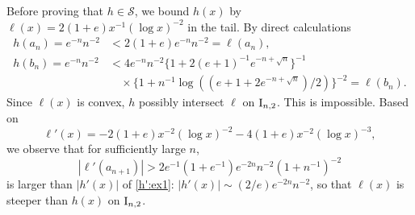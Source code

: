 \documentclass[12pt,leqno]{amsart}
\newcommand{\rI}{{\rm I}}
\newcommand{\cals}{{\mathcal S}}
\newcommand{\1}{{\mathbf 1}}
\begin{document}
Before proving that $h\in \cals$, we bound $h(x)$ by $\ell(x)=2(1+e)x^{-1}(\log x)^{-2}$ in the tail. 
By direct calculations 
\begin{align*}
h(a_n) = e^{-n}n^{-2} &< 2(1+e) e^{-n}n^{-2} =\ell(a_n), \\
h(b_n) = e^{-n}n^{-2} &< 4e^{-n}n^{-2}\{1+2(e+1)^{-1}e^{-n+\sqrt{n}}\}^{-1} \\
&\quad \times \{1+n^{-1}\log ((e+1+2e^{-n+\sqrt{n}})/2)\}^{-2} = \ell (b_n). 
\end{align*}
Since $\ell(x)$ is convex, $h$ possibly intersect $\ell$ on $\rI_{n,2}$. 
This is impossible. Based on 
\[
 \ell'(x)=-2 (1+e)x^{-2} (\log x)^{-2}- 4 (1+e)x^{-2} (\log x)^{-3},
\]
we observe that for sufficiently large $n$,  
\[
 |\ell' (a_{n+1})|> 2 e^{-1}(1+e^{-1}) e^{-2n}n^{-2}(1+n^{-1})^{-2}
\]
is larger than $|h'(x)|$ of \eqref{h':ex1}: $|h'(x)|\sim (2/e) e^{-2n}n^{-2}$, so that $\ell (x)$ is steeper than $h(x)$ on $\rI_{n,2}$.
\end{document}
